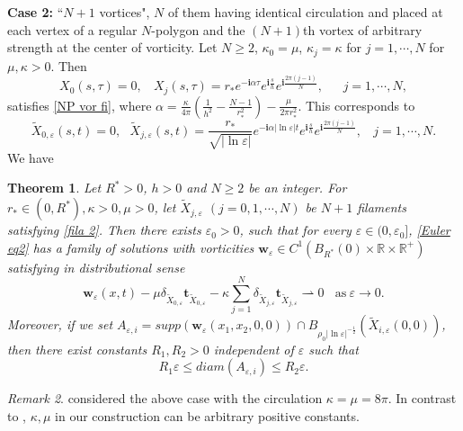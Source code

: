 \documentclass[12pt,reqno]{amsart}
\numberwithin{equation}{section}
\newtheorem{theorem}{Theorem}[section]
\theoremstyle{definition}
\theoremstyle{remark}
\newtheorem{remark}[theorem]{Remark}
\begin{document}
\textbf{Case 2:} ``$ N+1 $ vortices", $ N $ of them having identical circulation and placed  at each vertex of a regular $ N $-polygon   and the $ (N +1) $th vortex of arbitrary strength
at the center of vorticity. Let  $ N\geq 2 $, $ \kappa_0=\mu $, $ \kappa_j=\kappa $ for $ j=1,\cdots,N $ for   $ \mu, \kappa>0 $. Then 
\begin{equation*} 
X_0(s,\tau)=0,\ \ \ \ X_{j}(s,\tau)=r_*e^{-\mathbf{i}\alpha\tau}e^{\mathbf{i}\frac{s}{h}}e^{\mathbf{i}\frac{2\pi (j-1)}{N}},\ \ \ \ \ \ \  j=1,\cdots,N,
\end{equation*}
satisfies \eqref{NP vor fi}, where $ \alpha=\frac{\kappa}{4\pi}\left( \frac{1}{h^2}-\frac{N-1}{r_*^2}\right)-\frac{\mu}{2\pi r_*^2}  $. This corresponds to  
\begin{equation}\label{fila 2}
\tilde{X}_{0,\varepsilon}(s,t)=0,\ \ \  \tilde{X}_{j,\varepsilon}(s,t)=\frac{r_*}{\sqrt{|\ln\varepsilon|}}e^{-\mathbf{i}\alpha|\ln\varepsilon|t}e^{\mathbf{i}\frac{s}{h}}e^{\mathbf{i}\frac{2\pi (j-1)}{N}},
 \ \ \ \ j=1,\cdots,N.
\end{equation}
We have 
\begin{theorem}\label{thm02}
	Let $ R^*>0 $, $ h>0 $ and $ N\geq 2 $ be an integer. For $ r_*\in (0,R^*) , \kappa>0, \mu>0 $, let $ \tilde{X}_{j,\varepsilon} $ $(j=0,1,\cdots,N)$ be $ N+1 $ filaments satisfying \eqref{fila 2}. Then  there exists $ \varepsilon_0>0 $, such that for every $ \varepsilon\in(0,\varepsilon_0] $, \eqref{Euler eq2} has a family of solutions with vorticities  $ \mathbf{w}_\varepsilon\in C^1(B_{R^*}(0)\times \mathbb{R}\times\mathbb{R}^+) $ satisfying in distributional sense
	\begin{equation*} 
	\mathbf{w}_\varepsilon(x,t)-\mu\delta_{\tilde{X}_{0,\varepsilon}}\textbf{t}_{\tilde{X}_{0,\varepsilon}}- \kappa\sum_{j=1}^N\delta_{\tilde{X}_{j,\varepsilon}}\textbf{t}_{\tilde{X}_{j,\varepsilon}}\rightharpoonup0\ \ \ \ \text{as}\ \varepsilon\to0.
	\end{equation*}
	Moreover, if we set $ A_{\varepsilon,i}=supp\left (\mathbf{w}_\varepsilon(x_1,x_2,0,0)\right ) \cap B_{\rho_0|\ln\varepsilon|^{-\frac{1}{2}}}\left ( \tilde{X}_{i,\varepsilon}(0,0)\right )  $, then there exist constants $ R_1,R_2>0 $ independent of $ \varepsilon $  such that
	\begin{equation*}
	R_1\varepsilon \leq diam(A_{\varepsilon,i})\leq R_2\varepsilon .
	\end{equation*}
\end{theorem}

\begin{remark}
\cite{GM2} considered the above case with the circulation $ \kappa=\mu=8\pi $. In contrast to \cite{GM2}, $ \kappa,\mu $ in our construction can be arbitrary positive constants. 
\end{remark}
\end{document}
